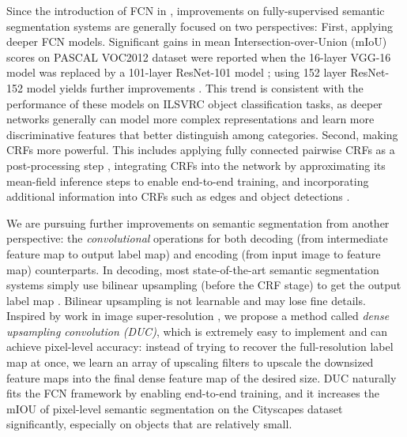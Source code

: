 \documentclass[10pt,twocolumn,letterpaper]{article}
\begin{document}
Since the introduction of FCN in \cite{long2015fully}, improvements on fully-supervised semantic segmentation systems are generally focused on two perspectives: First, applying deeper FCN models. Significant gains in mean Intersection-over-Union (mIoU) scores on PASCAL VOC2012 dataset \cite{pascal-voc-2012} were reported when the 16-layer VGG-16 model \cite{simonyan2014very} was replaced by a 101-layer ResNet-101 \cite{he2015deep} model \cite{chen2016deeplab}; using 152 layer ResNet-152 model yields further improvements \cite{wu2016high}. This trend is consistent with the performance of these models on ILSVRC \cite{russakovsky2015imagenet} object classification tasks, as deeper networks generally can model more complex representations and learn more discriminative features that better distinguish among categories. Second, making CRFs more powerful. This includes applying fully connected pairwise CRFs \cite{koltun2011efficient} as a post-processing step \cite{chen2016deeplab}, integrating CRFs into the network by approximating its mean-field inference steps \cite{zheng2015conditional,liu2015semantic,lin2015efficient} to enable end-to-end training, and incorporating additional information into CRFs such as edges \cite{kokkinos2015pushing} and object detections \cite{arnab2015higher}.

We are pursuing further improvements on semantic segmentation from another perspective: the \textit{convolutional} operations for both decoding (from intermediate feature map to output label map) and encoding (from input image to feature map) counterparts. In decoding, most state-of-the-art semantic segmentation systems simply use bilinear upsampling (before the CRF stage) to get the output label map \cite{lin2015efficient,liu2015semantic,chen2016deeplab}. Bilinear upsampling is not learnable and may lose fine details. Inspired by work in image super-resolution \cite{shi2016real}, we propose a method called  \textit{dense upsampling convolution (DUC)}, which is extremely easy to implement and can achieve pixel-level accuracy: instead of trying to recover the full-resolution label map at once, we learn an array of upscaling filters to upscale the downsized feature maps into the final dense feature map of the desired size. DUC naturally fits the FCN framework by enabling end-to-end training, and it increases the mIOU of pixel-level semantic segmentation on the Cityscapes dataset \cite{Cordts2016Cityscapes} significantly, especially on objects that are relatively small.
\end{document}
